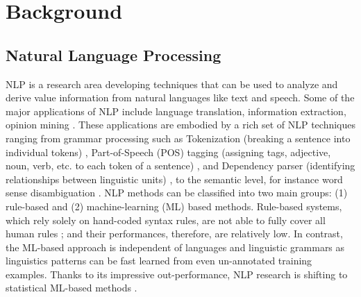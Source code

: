\documentclass[Journal, BackFigs,NoLists, DoubleSpace]{ascelike}%
\begin{document}
\section{Background} \label{sec:litrev} %
%
\subsection{Natural Language Processing}
NLP is a research area developing techniques that can be used to analyze and derive value information from natural languages like text and speech. Some of the major applications of NLP include language translation, information extraction, opinion mining \cite{Cambria14}. These applications are embodied by a rich set of NLP techniques ranging from grammar processing such as Tokenization (breaking a sentence into individual tokens) \cite{Webster92,Zhao11},  Part-of-Speech (POS) tagging (assigning tags, adjective, noun, verb, etc. to each token of a sentence) \cite{Toutanova03,Cunningham02}, and Dependency parser (identifying relationships between linguistic units) \cite{chen14}, to the semantic level, for instance word sense disambiguation \cite{Lesk86,Yarowsky95,Navigli09}. NLP methods can be classified into two main groups: (1) rule-based and (2) machine-learning (ML) based methods. Rule-based systems, which rely solely on hand-coded syntax rules, are not able to fully cover all human rules \cite{Marcus95}; and their performances, therefore, are relatively low. In contrast, the ML-based approach is independent of languages and linguistic grammars \cite{costa-jussa12} as linguistics patterns can be fast learned from even un-annotated training examples. Thanks to its impressive out-performance, NLP research is shifting to statistical ML-based methods \cite{Cambria14}. 
%
\end{document}
